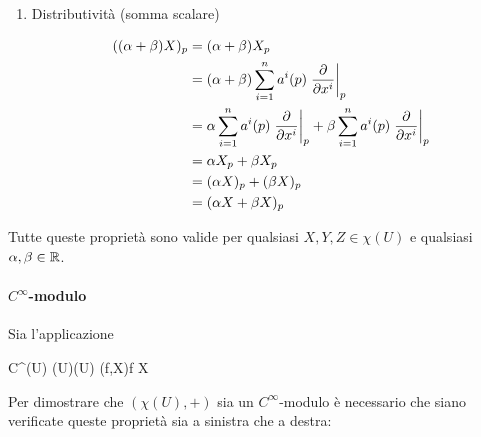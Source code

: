 {\begin{enumerate}
	\begin{align}
		\begin{split}
			(\alpha (X + Y))_{p} &= \alpha (X + Y)_{p} \\
			&= \alpha (X_{p} + Y_{p}) \\
			&= \alpha \left( \sum_{i=1}^{n} a^{i} (p) \eval{ \pdv{x^{i}} }_{p} + \sum_{i=1}^{n} b^{i} (p) \eval{ \pdv{x^{i}} }_{p} \right) \\
			&= \alpha \sum_{i=1}^{n} a^{i} (p) \eval{ \pdv{x^{i}} }_{p} + \alpha \sum_{i=1}^{n} b^{i} (p) \eval{ \pdv{x^{i}} }_{p} \\
			&= \alpha X_{p} + \alpha Y_{p} \\
			&= (\alpha X)_{p} + (\alpha Y)_{p} \\
			&= (\alpha X + \alpha Y)_{p}
		\end{split}
	\end{align}
	
	\item Distributività (somma scalare)
	
	\begin{align}
		\begin{split}
			((\alpha + \beta) X)_{p} &= (\alpha + \beta) X_{p} \\
			&= (\alpha + \beta) \sum_{i=1}^{n} a^{i} (p) \eval{ \pdv{x^{i}} }_{p} \\
			&= \alpha \sum_{i=1}^{n} a^{i} (p) \eval{ \pdv{x^{i}} }_{p} + \beta \sum_{i=1}^{n} a^{i} (p) \eval{ \pdv{x^{i}} }_{p} \\
			&= \alpha X_{p} + \beta X_{p} \\
			&= (\alpha X)_{p} + (\beta X)_{p} \\
			&= (\alpha X + \beta X)_{p} 
		\end{split}
	\end{align}
\end{enumerate}

Tutte queste proprietà sono valide per qualsiasi $ X, Y, Z \in \chi(U) $ e qualsiasi $ \alpha, \beta \in \mathbb{R} $.

\paragraph{$ C^{\infty} $-modulo}

Sia l'applicazione

\map{\cdot}
	{C^{\infty}(U) \times \chi(U)}{\chi(U)}
	{(f,X)}{f X}

Per dimostrare che $ (\chi(U),+) $ sia un $ C^{\infty} $-modulo è necessario che siano verificate queste proprietà sia a sinistra che a destra:

}
